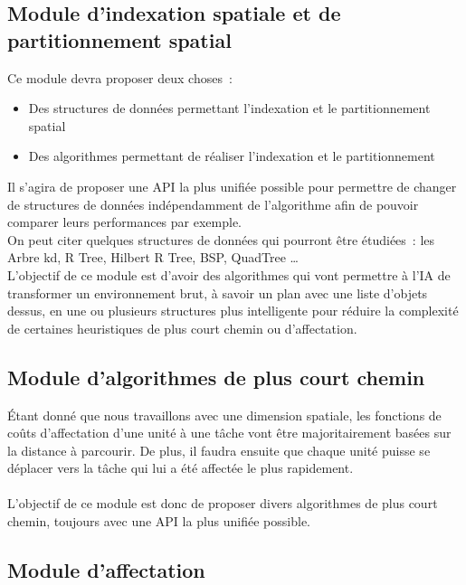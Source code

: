 \subsection{Module d'indexation spatiale et de partitionnement spatial}

Ce module devra proposer deux choses~:
\begin{itemize}
\item Des structures de données permettant l'indexation et le partitionnement spatial
\item Des algorithmes permettant de réaliser l'indexation et le partitionnement\\
\end{itemize}

Il s'agira de proposer une API la plus unifiée possible pour permettre de changer de structures de données indépendamment de l'algorithme afin de pouvoir comparer leurs performances par exemple.\\

On peut citer quelques structures de données qui pourront être étudiées~: les Arbre kd, R Tree, Hilbert R Tree, BSP, QuadTree \ldots \\

L'objectif de ce module est d'avoir des algorithmes qui vont permettre à l'IA de transformer un environnement \og brut\fg, à savoir un plan avec une liste d'objets dessus, en une ou plusieurs structures plus intelligente pour réduire la complexité de certaines heuristiques de plus court chemin ou d'affectation.

\subsection{Module d'algorithmes de plus court chemin}

Étant donné que nous travaillons avec une dimension spatiale, les fonctions de coûts d'affectation d'une unité à une tâche vont être majoritairement basées sur la distance à parcourir. De plus, il faudra ensuite que chaque unité puisse se déplacer vers la tâche qui lui a été affectée le plus rapidement.\\\\

L'objectif de ce module est donc de proposer divers algorithmes de plus court chemin, toujours avec une API la plus unifiée possible.

\subsection{Module d'affectation}

